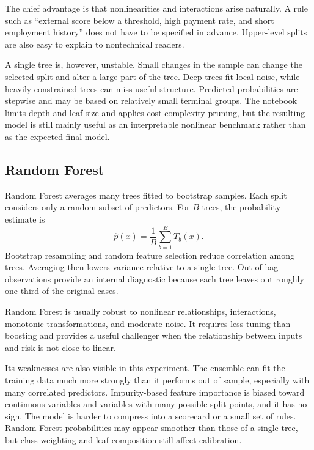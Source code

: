 \documentclass[11pt]{article}
\begin{document}
The chief advantage is that nonlinearities and interactions arise naturally. A rule such as ``external score below a threshold, high payment rate, and short employment history'' does not have to be specified in advance. Upper-level splits are also easy to explain to nontechnical readers.

A single tree is, however, unstable. Small changes in the sample can change the selected split and alter a large part of the tree. Deep trees fit local noise, while heavily constrained trees can miss useful structure. Predicted probabilities are stepwise and may be based on relatively small terminal groups. The notebook limits depth and leaf size and applies cost-complexity pruning, but the resulting model is still mainly useful as an interpretable nonlinear benchmark rather than as the expected final model.

\subsection{Random Forest}
Random Forest averages many trees fitted to bootstrap samples. Each split considers only a random subset of predictors. For $B$ trees, the probability estimate is
\begin{equation}
\hat p(x)=\frac{1}{B}\sum_{b=1}^{B} T_b(x).
\end{equation}
Bootstrap resampling and random feature selection reduce correlation among trees. Averaging then lowers variance relative to a single tree. Out-of-bag observations provide an internal diagnostic because each tree leaves out roughly one-third of the original cases.

Random Forest is usually robust to nonlinear relationships, interactions, monotonic transformations, and moderate noise. It requires less tuning than boosting and provides a useful challenger when the relationship between inputs and risk is not close to linear.

Its weaknesses are also visible in this experiment. The ensemble can fit the training data much more strongly than it performs out of sample, especially with many correlated predictors. Impurity-based feature importance is biased toward continuous variables and variables with many possible split points, and it has no sign. The model is harder to compress into a scorecard or a small set of rules. Random Forest probabilities may appear smoother than those of a single tree, but class weighting and leaf composition still affect calibration.
\end{document}
